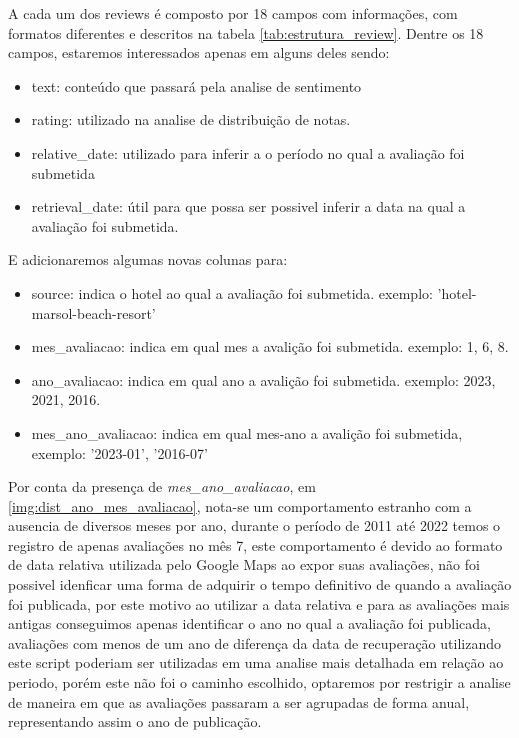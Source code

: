 A cada um dos reviews é composto por 18 campos com informações, com formatos diferentes e descritos na tabela \ref{tab:estrutura_review}. Dentre os 18 campos, estaremos interessados apenas em alguns deles sendo:
\begin{itemize}
	\item text: conteúdo que passará pela analise de sentimento
	\item rating: utilizado na analise de distribuição de notas.
	\item relative\_date: utilizado para inferir a o período no qual a avaliação foi submetida
	\item retrieval\_date: útil para que possa ser possivel inferir a data na qual a avaliação foi submetida.
\end{itemize}

E adicionaremos algumas novas colunas para:

\begin{itemize}
	\item source: indica o hotel ao qual a avaliação foi submetida. exemplo: 'hotel-marsol-beach-resort'
	\item mes\_avaliacao: indica em qual mes a avalição foi submetida. exemplo: 1, 6, 8.
	\item ano\_avaliacao: indica em qual ano a avalição foi submetida. exemplo: 2023, 2021, 2016.
	\item mes\_ano\_avaliacao: indica em qual mes-ano a avalição foi submetida, exemplo: '2023-01', '2016-07'
\end{itemize}

Por conta da presença de \emph{mes\_ano\_avaliacao}, em \ref{img:dist_ano_mes_avaliacao}, nota-se um comportamento estranho com a ausencia de diversos meses por ano, durante o período de 2011 até 2022 temos o registro de apenas avaliações no mês 7, este comportamento é devido ao formato de data relativa utilizada pelo Google Maps ao expor suas avaliações, não foi possivel idenficar uma forma de adquirir o tempo definitivo de quando a avaliação foi publicada, por este motivo ao utilizar a data relativa e para as avaliações mais antigas conseguimos apenas identificar o ano no qual a avaliação foi publicada, avaliações com menos de um ano de diferença da data de recuperação utilizando este script poderiam ser utilizadas em uma analise mais detalhada em relação ao periodo, porém este não foi o caminho escolhido, optaremos por restrigir a analise de maneira em que as avaliações passaram a ser agrupadas de forma anual, representando assim o ano de publicação.

